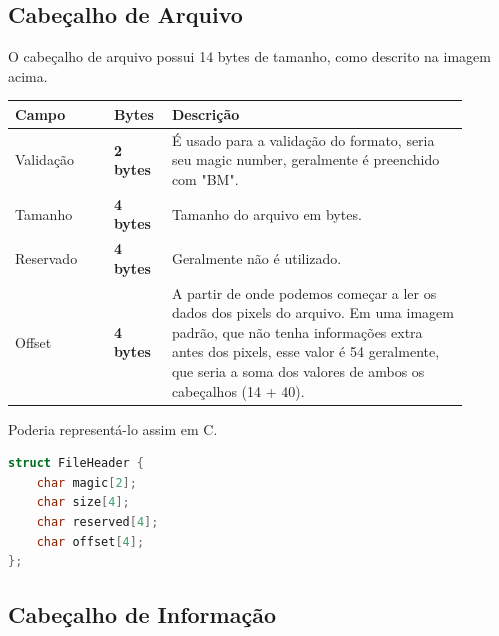 \documentclass[a4paper,oneside,12pt]{article}
\begin{document}
\subsection{Cabeçalho de Arquivo}

O cabeçalho de arquivo possui 14 bytes de tamanho, como descrito na imagem acima.

\begin{center}
\begin{tabular}{|p{0.2\linewidth}|p{0.1\linewidth}|p{0.6\linewidth}|}
    \hline
    \textbf{Campo} & \textbf{Bytes} & \textbf{Descrição}\\
    \hline
    Validação & \textbf{2 bytes} & É usado para a validação do formato, seria seu magic number, geralmente é preenchido com "BM".\\
    \hline
    Tamanho & \textbf{4 bytes} & Tamanho do arquivo em bytes.\\
    \hline
    Reservado & \textbf{4 bytes} & Geralmente não é utilizado.\\
    \hline
    Offset & \textbf{4 bytes} & A partir de onde podemos começar a ler os dados dos pixels do arquivo. Em uma imagem padrão, que não tenha informações extra antes dos pixels, esse valor é 54 geralmente, que seria a soma dos valores de ambos os cabeçalhos (14 + 40).\\
    \hline
\end{tabular}
\end{center}

Poderia representá-lo assim em C.
\begin{lstlisting}[language=C, caption=Cabeçalho de Arquivo em C]
struct FileHeader {
    char magic[2];
    char size[4];
    char reserved[4];
    char offset[4];
};
\end{lstlisting}

\subsection{Cabeçalho de Informação}
\end{document}

